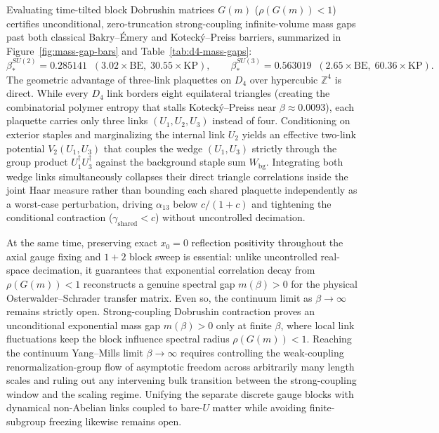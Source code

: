 Evaluating time-tilted block Dobrushin matrices $G(m)$ ($\rho(G(m)) < 1$) certifies unconditional, zero-truncation
strong-coupling infinite-volume mass gaps past both classical Bakry--\'Emery and Koteck\'y--Preiss barriers, summarized
in Figure~\ref{fig:mass-gap-bars} and Table~\ref{tab:d4-mass-gaps}:
\begin{equation}
\beta_*^{SU(2)} = 0.285141 \;\; (3.02\times\mathrm{BE},\; 30.55\times\mathrm{KP}),
\qquad
\beta_*^{SU(3)} = 0.563019 \;\; (2.65\times\mathrm{BE},\; 60.36\times\mathrm{KP}).
\label{eq:ym-thresholds}
\end{equation}
The geometric advantage of three-link plaquettes on $D_4$ over hypercubic $\mathbb{Z}^4$ is direct. While every $D_4$
link borders eight equilateral triangles (creating the combinatorial polymer entropy that stalls Koteck\'y--Preiss near
$\beta \approx 0.0093$), each plaquette carries only three links $(U_1, U_2, U_3)$ instead of four. Conditioning on
exterior staples and marginalizing the internal link $U_2$ yields an effective two-link potential $V_2(U_1, U_3)$ that
couples the wedge $(U_1, U_3)$ strictly through the group product $U_1^\dagger U_3^\dagger$ against the background
staple sum $W_{\mathrm{bg}}$. Integrating both wedge links simultaneously collapses their direct triangle correlations
inside the joint Haar measure rather than bounding each shared plaquette independently as a worst-case perturbation,
driving $\alpha_{13}$ below $c / (1 + c)$ and tightening the conditional contraction ($\gamma_{\mathrm{shared}} < c$)
without uncontrolled decimation.

At the same time, preserving exact $x_0 = 0$ reflection positivity throughout the axial gauge fixing and $1 + 2$ block
sweep is essential: unlike uncontrolled real-space decimation, it guarantees that exponential correlation decay from
$\rho(G(m)) < 1$ reconstructs a genuine spectral gap $m(\beta) > 0$ for the physical Osterwalder--Schrader transfer
matrix. Even so, the continuum limit as $\beta \to \infty$ remains strictly open. Strong-coupling Dobrushin contraction
proves an unconditional exponential mass gap $m(\beta) > 0$ only at finite $\beta$, where local link fluctuations keep
the block influence spectral radius $\rho(G(m)) < 1$. Reaching the continuum Yang--Mills limit $\beta \to \infty$
\cite{jaffe2000ym, balaban1989} requires controlling the weak-coupling renormalization-group flow of asymptotic freedom
across arbitrarily many length scales and ruling out any intervening bulk transition between the strong-coupling window
and the scaling regime. Unifying the separate discrete gauge blocks with dynamical non-Abelian links coupled to bare-$U$
matter while avoiding finite-subgroup freezing likewise remains open.

